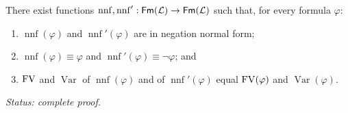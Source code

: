 \begin{lemma}
\label{lem:fol-nnf}
There exist functions
\(\operatorname{nnf},\operatorname{nnf}':\mathsf{Fm}(\mathcal{L})\to\mathsf{Fm}(\mathcal{L})\) such
that, for every formula \(\varphi\):
\begin{enumerate}
  \item \(\operatorname{nnf}(\varphi)\) and \(\operatorname{nnf}'(\varphi)\)
        are in negation normal form;
  \item \(\operatorname{nnf}(\varphi)\equiv\varphi\) and
        \(\operatorname{nnf}'(\varphi)\equiv\neg\varphi\); and
  \item \(\operatorname{FV}\) and \(\operatorname{Var}\) of
        \(\operatorname{nnf}(\varphi)\) and of
        \(\operatorname{nnf}'(\varphi)\) equal \(\operatorname{FV}(\varphi)\) and
        \(\operatorname{Var}(\varphi)\).
\end{enumerate}
\textit{Status: complete proof.}
\end{lemma}
